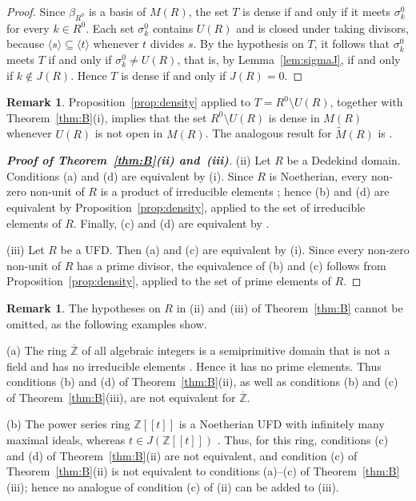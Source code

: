 \documentclass[12pt,reqno,a4paper]{amsart}
\newcommand{\Z}{\mathbb{Z}}
\newcommand{\pow}[1]{[\![#1]\!]}
\theoremstyle{plain}
\theoremstyle{definition}
\newtheorem{remark}[theorem]{Remark}
\begin{document}
\begin{proof}
Since $\beta_{R^0}$ is a basis of $M(R)$, the set $T$ is dense if and only if it meets $\sigma_k^0$ for every $k\in R^0$. Each set $\sigma_k^0$ contains $U(R)$ and is closed under taking divisors, because $\langle s\rangle\subseteq\langle t\rangle$ whenever $t$ divides $s$. By the hypothesis on $T$, it follows that $\sigma_k^0$ meets $T$ if and only if $\sigma_k^0\neq U(R)$, that is, by Lemma~\ref{lem:sigmaJ}, if and only if $k\notin J(R)$. Hence $T$ is dense if and only if $J(R)=0$.
\end{proof}
\begin{remark}\label{rem:MO-dense}
Proposition~\ref{prop:density} applied to $T=R^0\setminus U(R)$, together with Theorem~\ref{thm:B}(i), implies that the set $R^0\setminus U(R)$ is dense in $M(R)$ whenever $U(R)$ is not open in $M(R)$. The analogous result for $\widetilde{M}(R)$ is \cite[Theorem~4.3]{MaciasOrtiz}.
\end{remark}
\begin{proof}[\normalfont\bfseries Proof of Theorem~\ref{thm:B}(ii) and~(iii)]
(ii) Let $R$ be a Dedekind domain. Conditions {(a)} and {(d)} are equivalent by {(i)}. Since $R$ is Noetherian, every non-zero non-unit of $R$ is a product of irreducible elements \cite[Section~2.1]{Clark}; hence {(b)} and {(d)} are equivalent by Proposition~\ref{prop:density}, applied to the set of irreducible elements of $R$. Finally, {(c)} and {(d)} are equivalent by \cite[Theorem~4.8]{Clark}.

(iii) Let $R$ be a UFD. Then {(a)} and {(c)} are equivalent by {(i)}. Since every non-zero non-unit of $R$ has a prime divisor, the equivalence of {(b)} and {(c)} follows from Proposition~\ref{prop:density}, applied to the set of prime elements of $R$.
\end{proof}
\begin{remark}\label{rem:antimatter}
The hypotheses on $R$ in (ii) and (iii) of Theorem~\ref{thm:B} cannot be omitted, as the following examples show.

(a) The ring $\overline{\Z}$ of all algebraic integers is a semiprimitive domain that is not a field and has no irreducible elements \cite[Example~4.7]{Clark}. Hence it has no prime elements. Thus conditions (b) and (d) of Theorem~\ref{thm:B}(ii), as well as conditions (b) and (c) of Theorem~\ref{thm:B}(iii), are not equivalent for $\overline{\Z}$.

(b) The power series ring $\Z\pow{t}$ is a Noetherian UFD with infinitely many maximal ideals, whereas $t\in J(\Z\pow{t})$ \cite[Example~4.12]{Clark}. Thus, for this ring, conditions (c) and (d) of Theorem~\ref{thm:B}(ii) are not equivalent, and condition (c) of Theorem~\ref{thm:B}(ii) is not equivalent to conditions (a)--(c) of Theorem~\ref{thm:B}(iii); hence no analogue of condition (c) of (ii) can be added to (iii).
\end{remark}
\end{document}
